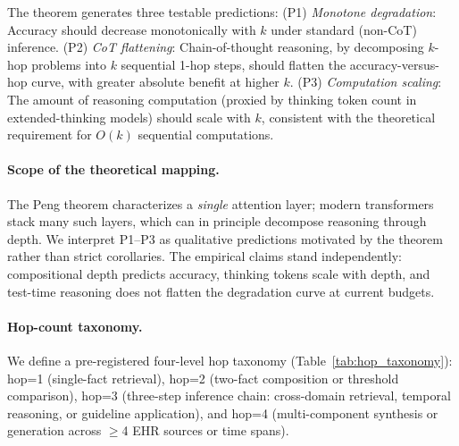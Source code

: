 \documentclass{article}
\begin{document}
The theorem generates three testable predictions:
(P1) \emph{Monotone degradation}: Accuracy should decrease monotonically with
$k$ under standard (non-CoT) inference.
(P2) \emph{CoT flattening}: Chain-of-thought reasoning, by decomposing
$k$-hop problems into $k$ sequential 1-hop steps, should flatten the
accuracy-versus-hop curve, with greater absolute benefit at higher $k$.
(P3) \emph{Computation scaling}: The amount of reasoning computation (proxied
by thinking token count in extended-thinking models) should scale with $k$,
consistent with the theoretical requirement for $O(k)$ sequential computations.

\paragraph{Scope of the theoretical mapping.}
The Peng theorem characterizes a \emph{single} attention layer; modern transformers stack many such layers, which can in principle decompose reasoning through depth. We interpret P1--P3 as qualitative predictions motivated by the theorem rather than strict corollaries. The empirical claims stand independently: compositional depth predicts accuracy, thinking tokens scale with depth, and test-time reasoning does not flatten the degradation curve at current budgets.

\paragraph{Hop-count taxonomy.}
We define a pre-registered four-level hop taxonomy (Table~\ref{tab:hop_taxonomy}): hop=1 (single-fact retrieval), hop=2 (two-fact composition or threshold comparison), hop=3 (three-step inference chain: cross-domain retrieval, temporal reasoning, or guideline application), and hop=4 (multi-component synthesis or generation across $\geq$4 EHR sources or time spans).
\end{document}
